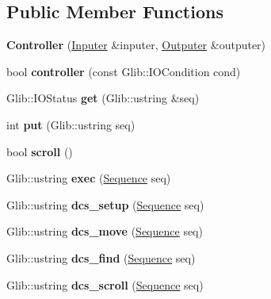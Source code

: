 \subsection*{Public Member Functions}
\begin{DoxyCompactItemize}
\item 
\mbox{\label{a00048_a6e66408f89303e9684a4ba88e21212e2}} 
{\bfseries Controller} (\hyperlink{a00044}{Inputer} \&inputer, \hyperlink{a00040}{Outputer} \&outputer)
\item 
\mbox{\label{a00048_a21117179f6c38e98c5f7f27f92353f56}} 
bool {\bfseries controller} (const Glib\+::\+I\+O\+Condition cond)
\item 
\mbox{\label{a00048_a917a873c1238b3e84c40492fa2fb8458}} 
Glib\+::\+I\+O\+Status {\bfseries get} (Glib\+::ustring \&seq)
\item 
\mbox{\label{a00048_a87d9bc4196a63f521a1a26370dc9d599}} 
int {\bfseries put} (Glib\+::ustring seq)
\item 
\mbox{\label{a00048_a4c711a4acf28d83caa66de761ef7ce08}} 
bool {\bfseries scroll} ()
\item 
\mbox{\label{a00048_ad8b9cbaa251de2d2d6fe57dd02318df8}} 
Glib\+::ustring {\bfseries exec} (\hyperlink{a00020}{Sequence} seq)
\item 
\mbox{\label{a00048_a947de364ba1bf3d80382241af2655d69}} 
Glib\+::ustring {\bfseries dcs\+\_\+setup} (\hyperlink{a00020}{Sequence} seq)
\item 
\mbox{\label{a00048_ae464f9974723e995a255ffa06ad0c956}} 
Glib\+::ustring {\bfseries dcs\+\_\+move} (\hyperlink{a00020}{Sequence} seq)
\item 
\mbox{\label{a00048_a3d41ede153f82fcdfd97e2065e0e2c8a}} 
Glib\+::ustring {\bfseries dcs\+\_\+find} (\hyperlink{a00020}{Sequence} seq)
\item 
\mbox{\label{a00048_ad06e95f8672f3b529826ab4bf36fe0f7}} 
Glib\+::ustring {\bfseries dcs\+\_\+scroll} (\hyperlink{a00020}{Sequence} seq)
\item 
\mbox{\label{a00048_ad82a254681cc287a260fd0eeea225804}} 

\end{DoxyCompactItemize}
